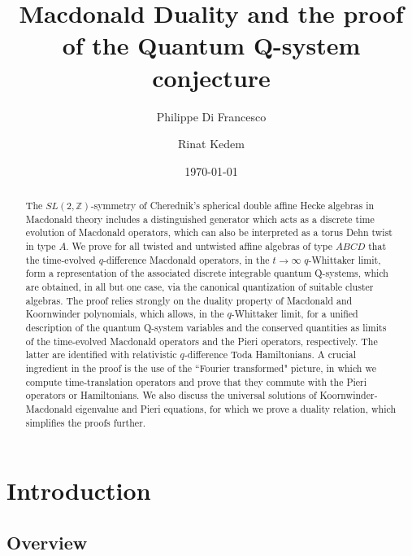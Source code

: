 \documentclass[12pt]{amsart}
\newcommand{\Z}{{\mathbb Z}}
\numberwithin{equation}{section}
\begin{document}
\title{Macdonald Duality and the proof of the Quantum Q-system conjecture}
\author{Philippe Di Francesco} 
\address{Department of Mathematics, University of Illinois MC-382, Urbana, IL 61821, 
U.S.A. e-mail: philippe@illinois.edu and 
Institut de physique th\'eorique, Universit\'e Paris Saclay, 
CEA, CNRS, F-91191 Gif-sur-Yvette, FRANCE\hfill
\break e-mail: philippe.di-francesco@cea.fr
}
\author{Rinat Kedem} 
\address{Department of Mathematics, University of Illinois MC-382, Urbana, IL 61821, 
U.S.A. \hfill
\break e-mail: rinat@illinois.edu}

\begin{abstract} The $SL(2,\Z)$-symmetry of 
Cherednik's spherical double affine Hecke algebras in Macdonald theory includes a distinguished generator
which acts as a discrete time evolution of Macdonald operators, which can also be interpreted as a torus Dehn twist in type $A$.
We prove for all twisted and untwisted affine algebras of  type $ABCD$ that the time-evolved $q$-difference Macdonald operators,
in the $t\to\infty$ $q$-Whittaker limit, form a representation of the associated discrete integrable quantum Q-systems, 
which are obtained, in all but one case, via the canonical quantization of suitable cluster algebras. 
The proof relies strongly on the duality 
property of Macdonald and Koornwinder polynomials, which allows, in the $q$-Whittaker limit, for a unified description of the quantum Q-system variables
and the conserved quantities as limits of the time-evolved Macdonald operators and the Pieri operators, respectively. The latter are identified with relativistic $q$-difference Toda Hamiltonians.
A crucial ingredient in the proof is the use of the ``Fourier transformed" picture, in which we compute time-translation operators and prove that they commute with the Pieri operators or Hamiltonians.
We also discuss the universal solutions of Koornwinder-Macdonald eigenvalue and Pieri equations, 
for which we prove a duality relation, which simplifies the proofs further.
\end{abstract}

\maketitle
\date{\today}
%
\section{Introduction}

\subsection{Overview}
\end{document}
